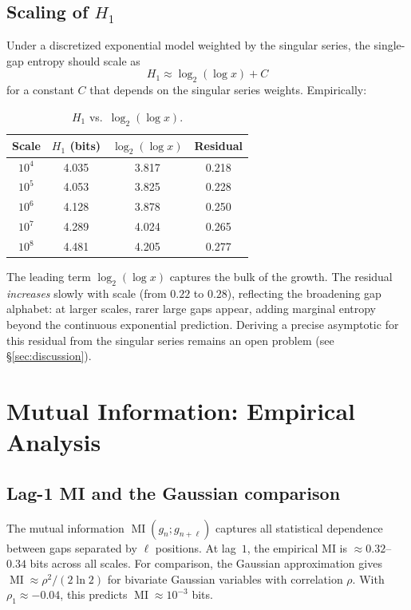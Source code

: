 \documentclass[11pt, a4paper]{amsart}
\theoremstyle{plain}
\theoremstyle{definition}
\newcommand{\MI}{\operatorname{MI}}
\begin{document}
\subsection{Scaling of $H_1$}

Under a discretized exponential model weighted by the singular series, the single-gap entropy should scale as
\begin{equation}\label{eq:H1-scaling}
H_1 \approx \log_2(\log x) + C
\end{equation}
for a constant $C$ that depends on the singular series weights. Empirically:

\begin{table}[ht]
\centering
\caption{$H_1$ vs.\ $\log_2(\log x)$.}
\label{tab:h1-scaling}
\begin{tabular}{cccc}
\toprule
Scale & $H_1$ (bits) & $\log_2(\log x)$ & Residual \\
\midrule
$10^4$ & 4.035 & 3.817 & 0.218 \\
$10^5$ & 4.053 & 3.825 & 0.228 \\
$10^6$ & 4.128 & 3.878 & 0.250 \\
$10^7$ & 4.289 & 4.024 & 0.265 \\
$10^8$ & 4.481 & 4.205 & 0.277 \\
\bottomrule
\end{tabular}
\end{table}

The leading term $\log_2(\log x)$ captures the bulk of the growth. The residual \emph{increases} slowly with scale (from $0.22$ to $0.28$), reflecting the broadening gap alphabet: at larger scales, rarer large gaps appear, adding marginal entropy beyond the continuous exponential prediction. Deriving a precise asymptotic for this residual from the singular series remains an open problem (see \S\ref{sec:discussion}).


\section{Mutual Information: Empirical Analysis}
\label{sec:mi}

\subsection{Lag-1 MI and the Gaussian comparison}

The mutual information $\MI(g_n; g_{n+\ell})$ captures all statistical dependence between gaps separated by $\ell$ positions.
At lag~$1$, the empirical MI is $\approx 0.32$--$0.34$ bits across all scales. For comparison, the Gaussian approximation gives $\MI \approx \rho^2/(2 \ln 2)$ for bivariate Gaussian variables with correlation $\rho$. With $\rho_1 \approx -0.04$, this predicts $\MI \approx 10^{-3}$ bits.
\end{document}
